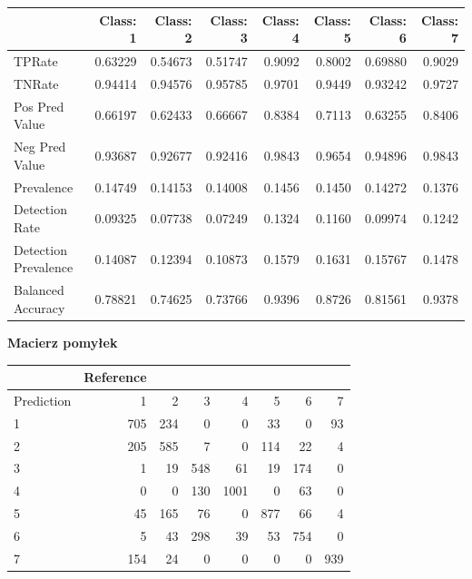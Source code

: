 \documentclass[11pt]{article} %
\begin{document}
\begin{center}
\begin{tabular}{ | l | r | r | r | r | r | r | r | }
\hline
&Class: 1 &Class: 2 &Class: 3 &Class: 4 &Class: 5 &Class: 6 &Class: 7\\ \hline
TPRate         &  0.63229&  0.54673&  0.51747 &  0.9092 &  0.8002&  0.69880 &  0.9029\\
TNRate         &  0.94414&  0.94576&  0.95785 &  0.9701 &  0.9449&  0.93242 &  0.9727\\
Pos Pred Value      &  0.66197&  0.62433&  0.66667 &  0.8384 &  0.7113&  0.63255 &  0.8406\\
Neg Pred Value      &  0.93687&  0.92677&  0.92416 &  0.9843 &  0.9654&  0.94896 &  0.9843\\
Prevalence          &  0.14749&  0.14153&  0.14008 &  0.1456 &  0.1450&  0.14272 &  0.1376\\
Detection Rate      &  0.09325&  0.07738&  0.07249 &  0.1324 &  0.1160&  0.09974 &  0.1242\\
Detection Prevalence&  0.14087&  0.12394&  0.10873 &  0.1579 &  0.1631&  0.15767 &  0.1478\\
Balanced Accuracy   &  0.78821&  0.74625&  0.73766 &  0.9396 &  0.8726&  0.81561 &  0.9378\\ \hline
\end{tabular}
\end{center}

\textbf{Macierz pomyłek}

\begin{center}
\begin{tabular}{ | l | r | r | r | r | r | r | r | }
\hline
& Reference\\ \hline
Prediction    &1    &2    &3    &4    &5    &6    &7\\ \hline
         1  &705  &234  &  0  &  0  & 33   & 0   &93\\
         2  &205  &585  &  7  &  0  &114   &22   & 4\\
         3  &  1  & 19  &548  & 61  & 19  &174   & 0\\
         4  &  0  &  0  &130 &1001  &  0  & 63   & 0\\
         5  & 45  &165  & 76  &  0  &877  & 66   & 4\\
         6  &  5  & 43  &298  & 39  & 53  &754   & 0\\
         7  &154  & 24 &   0  &  0  &  0  &  0  &939\\ \hline
\end{tabular}
\end{center}
\end{document}
